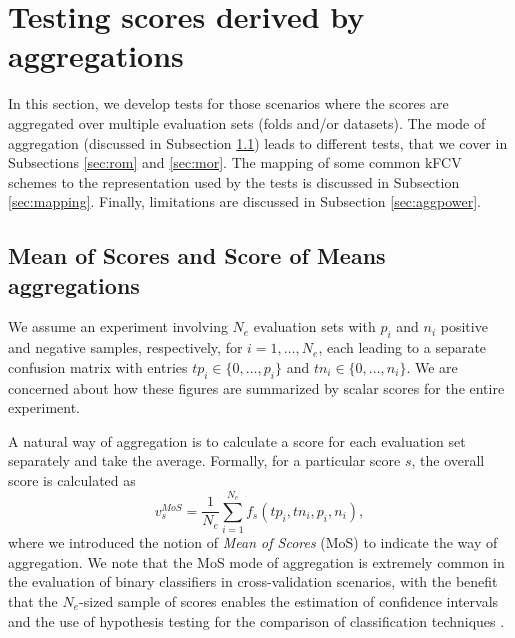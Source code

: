 \documentclass[3p, times]{elsarticle}
\begin{document}
\section{Testing scores derived by aggregations}
\label{sec:agg}

In this section, we develop tests for those scenarios where the scores are aggregated over multiple evaluation sets (folds and/or datasets). 
The mode of aggregation (discussed in Subsection \ref{sec:rommor}) leads to different tests, that we cover in Subsections \ref{sec:rom} and \ref{sec:mor}. 
The mapping of some common kFCV schemes to the representation used by the tests is discussed in Subsection \ref{sec:mapping}. Finally, limitations are discussed in Subsection \ref{sec:aggpower}.

\subsection{Mean of Scores and Score of Means aggregations}
\label{sec:rommor}

We assume an experiment involving $N_e$ evaluation sets with $p_i$ and $n_i$ positive and negative samples, respectively, for $i=1,\dots,N_e$, each leading to a separate confusion matrix with entries $tp_i \in \lbrace 0, \dots, p_i\rbrace$ and $tn_i\in \lbrace 0, \dots, n_i\rbrace$. We are concerned about how these figures are summarized by scalar scores for the entire experiment. 

A natural way of aggregation is to calculate a score for each evaluation set separately and take the average. Formally, for a particular score $s$, the overall score is calculated as
\begin{equation}
\label{estmor}
v_s^{MoS} = \dfrac{1}{N_e}\sum\limits_{i=1}^{N_e} f_s(tp_{i}, tn_{i}, p_{i}, n_{i}),
\end{equation}
where we introduced the notion of \emph{Mean of Scores} (MoS) to indicate the way of aggregation. We note that the MoS mode of aggregation is extremely common in the evaluation of binary classifiers in cross-validation scenarios, with the benefit that the $N_e$-sized sample of scores enables the estimation of confidence intervals \cite{morex2} and the use of hypothesis testing for the comparison of classification techniques \cite{morex0}.
\end{document}
